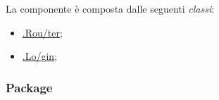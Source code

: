 La componente è composta dalle seguenti \textit{classi}:
\begin{itemize}
	\item \hyperref[router]{\logic{}.Rou\fshyp{}ter};
	\item \hyperref[login]{\logic{}.Lo\fshyp{}gin};
	
	\iffalse
	
	\item \hyperref[mainUser]{\logicUser{}.Ma\fshyp{}in\fshyp{}U\fshyp{}ser};
	\item \hyperref[register]{\logicUser{}.Re\fshyp{}gis\fshyp{}ter};
	\item \hyperref[userData]{\logicUser{}.U\fshyp{}ser\fshyp{}Da\fshyp{}ta};
	\item \hyperref[openProcess]{\logicUser{}.O\fshyp{}pen\fshyp{}Pro\fshyp{}cess};
	\item \hyperref[management]{\logicUser{}.Ma\fshyp{}na\fshyp{}ge\fshyp{}ment\fshyp{}Pro\fshyp{}cess};
	\item \hyperref[sendData{\logicUser{}.Send\fshyp{}Da\fshyp{}ta};
	\item \hyperref[sendText]{\logicUser{}.Send\fshyp{}Text};
	\item \hyperref[sendNumb]{\logicUser{}.Send\fshyp{}Numb};
	\item \hyperref[sendPosition]{\logicUser{}.Send\fshyp{}Po\fshyp{}si\fshyp{}tion};
	\item \hyperref[sendImage]{\logicUser{}.Send\fshyp{}I\fshyp{}ma\fshyp{}ge};
	\item \hyperref[printProcess]{\logicUser{}.Print\fshyp{}Pro\fshyp{}cess};
	\item \hyperref[mainProcessOwner]{\logicAdmin{}.Main\fshyp{}Pro\fshyp{}cess\fshyp{}Ow\fshyp{}ner};
	\item \hyperref[newProcess]{\logicAdmin{}.New\fshyp{}Pro\fshyp{}cess};
	\item \hyperref[addStep]{\logicAdmin{}.Add\fshyp{}Step};
	\item \hyperref[openProcess]{\logicAdmin{}.O\fshyp{}pen\fshyp{}Pro\fshyp{}cess};
	\item \hyperref[manageProcess]{\logicAdmin{}.Ma\fshyp{}na\fshyp{}ge\fshyp{}Pro\fshyp{}cess};
	\item \hyperref[checkStep]{\logicAdmin{}.Check\fshyp{}Step};
	
	\fi
	
\end{itemize}


\subsubsection{Package \logic{}}

